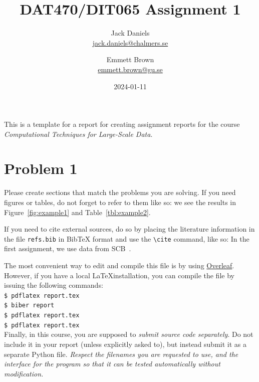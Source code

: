 \documentclass[a4paper]{article}
\begin{document}
\author{Jack Daniels \\
  \href{mailto:jack.daniels@chalmers.se}{jack.daniels@chalmers.se}
  \and
  Emmett Brown \\
  \href{mailto:emmett.brown@gu.se}{emmett.brown@gu.se}
}
\title{DAT470/DIT065 Assignment 1}
\date{2024-01-11}

\maketitle

This is a template for a report for creating assignment reports for
the course \emph{Computational Techniques for Large-Scale Data}.

\section*{Problem 1}

Please create sections that match the problems you are solving. If you
need figures or tables, do not forget to refer to them like so: we
see the results in Figure~\ref{fig:example1} and
Table~\ref{tbl:example2}.

If you need to cite external sources, do so by placing the literature
information in the file \texttt{refs.bib} in BibTeX format and use the
\texttt{\textbackslash{}cite} command, like so: In the first
assignment, we use data from SCB~\cite{SCB:2023}.

The most convenient way to edit and compile this file is by using
\href{https://www.overleaf.com}{Overleaf}. However, if you have a
local \LaTeX installation, you can compile the file by issuing the
following commands:\\
\texttt{\$ pdflatex report.tex} \\
\texttt{\$ biber report} \\
\texttt{\$ pdflatex report.tex} \\
\texttt{\$ pdflatex report.tex} \\


Finally, in this course, you are supposed to \emph{submit source code
  separately}. Do not include it in your report (unless explicitly
asked to), but instead submit it as a separate Python
file. \emph{Respect the filenames you are requested to use, and the
  interface for the program so that it can be tested automatically
  without modification.}
\end{document}

